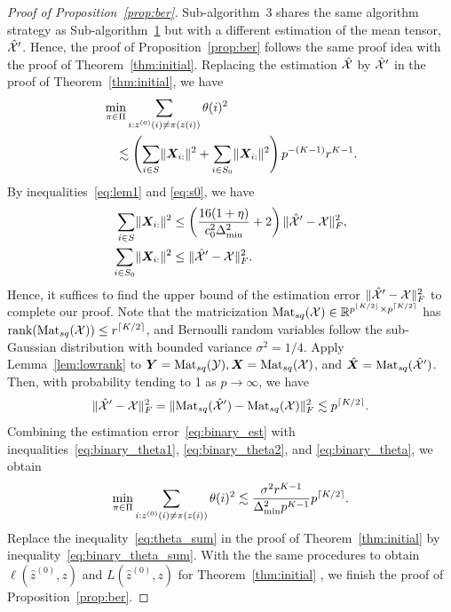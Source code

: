 \documentclass[journal]{IEEEtran}
\theoremstyle{definition}
\theoremstyle{definition}
\newcommand{\of}[1]{\left(#1\right)}
\newcommand{\Mat}{\text{Mat}}
\DeclarePairedDelimiter{\ceil}{\lceil}{\rceil}
\DeclarePairedDelimiter{\floor}{\lfloor}{\rfloor}
\begin{document}
\begin{proof}[Proof of Proposition~\ref{prop:ber}]  Sub-algorithm~3 shares the same algorithm strategy as Sub-algorithm~\hyperref[alg:main]{1} but with a different estimation of the mean tensor, $\hat {\mathcal{X}}'$. Hence, the proof of Proposition~\ref{prop:ber} follows the same proof idea with the proof of Theorem~\ref{thm:initial}. Replacing the estimation $\hat {\mathcal{X}}$ by $\hat {\mathcal{X}}'$ in the proof of Theorem~\ref{thm:initial}, we have 
\begin{align}
        & \min_{\pi \in \Pi} \sum_{i : z^{(0)}(i) \neq \pi(z(i))} \theta(i)^2  \\
        &\quad \lesssim \of{\sum_{i \in S} \onormSize{}{\mX_{i:}}^2 + \sum_{i \in S_0} \onormSize{}{\mX_{i:}}^2  } p^{-(K-1)} r^{K-1}. \label{eq:binary_theta}
    \end{align}
    \normalsize
By inequalities~\eqref{eq:lem1} and \eqref{eq:s0}, we have 
\begin{align}
   \sum_{i \in S} \onormSize{}{\mX_{i:}}^2 &\leq  \of{ \frac{16(1 + \eta)}{c_0^2 \Delta_{\min}^2 } + 2 }\onormSize{}{\hat \tX' - \tX}_F^2, \label{eq:binary_theta1}  \\
   \sum_{i \in S_0} \onormSize{}{\mX_{i:}}^2 &\leq  \onormSize{}{\hat \tX' - \tX}_F^2. \label{eq:binary_theta2}
\end{align}
Hence, it suffices to find the upper bound of the estimation error $\lVert\hat {\mathcal{X}}' - \mathcal{X}\rVert_F^2$ to complete our proof. Note that the matricization $\Mat_{sq}(\tX) \in \bbR^{p^{\floor{K/2}} \times p^{\ceil{K/2}}}$ has $\text{rank}(\Mat_{sq}(\tX)) \leq r^{\ceil{K/2}}$, and Bernoulli random variables follow the sub-Gaussian distribution with bounded variance $\sigma^2 = 1/4$. Apply Lemma~\ref{lem:lowrank} to $\mY = \Mat_{sq}(\tY), \mX = \Mat_{sq}(\tX)$, and $\hat \mX = \Mat_{sq}(\hat \tX')$. Then, with probability tending to 1 as $ p \rightarrow \infty$, we have 
        \begin{equation}\label{eq:binary_est}
            \onormSize{}{\hat \tX' - \tX}_F^2 = \onormSize{}{\Mat_{sq}(\hat \tX') - \Mat_{sq}(\tX)}_F^2 \lesssim p^{\ceil{K/2}}.
        \end{equation}
Combining the estimation error~\eqref{eq:binary_est} with inequalities~\eqref{eq:binary_theta1}, \eqref{eq:binary_theta2}, and \eqref{eq:binary_theta}, we obtain 
\begin{equation}\label{eq:binary_theta_sum}
    \min_{\pi \in \Pi} \sum_{i : z^{(0)}(i) \neq \pi(z(i))} \theta(i)^2 \lesssim  \frac{\sigma^2 r^{K-1}}{ \Delta_{\min}^2  p^{K-1} } p^{\ceil{K/2}}.
\end{equation}
Replace the inequality~\eqref{eq:theta_sum} in the proof of Theorem~\ref{thm:initial} by inequality~\eqref{eq:binary_theta_sum}. With the the same procedures to obtain $\ell(\hat z^{(0)}, z)$ and $L(\hat z^{(0)}, z)$ for Theorem~\ref{thm:initial} , we finish the proof of Proposition~\ref{prop:ber}.
\end{proof}
\end{document}
